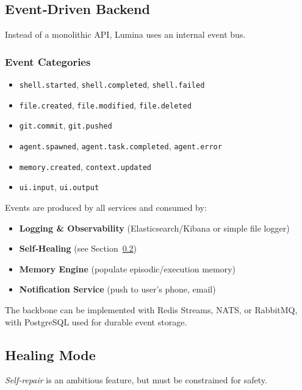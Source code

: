 \documentclass[12pt,a4paper]{article}
\begin{document}
\subsection{Event‑Driven Backend}
Instead of a monolithic API, Lumina uses an internal event bus.

\subsubsection{Event Categories}
\begin{itemize}[leftmargin=*]
    \item \texttt{shell.started}, \texttt{shell.completed}, \texttt{shell.failed}
    \item \texttt{file.created}, \texttt{file.modified}, \texttt{file.deleted}
    \item \texttt{git.commit}, \texttt{git.pushed}
    \item \texttt{agent.spawned}, \texttt{agent.task.completed}, \texttt{agent.error}
    \item \texttt{memory.created}, \texttt{context.updated}
    \item \texttt{ui.input}, \texttt{ui.output}
\end{itemize}

Events are produced by all services and consumed by:
\begin{itemize}[leftmargin=*]
    \item \textbf{Logging \& Observability} (Elasticsearch/Kibana or simple file logger)
    \item \textbf{Self‑Healing} (see Section~\ref{sec:healing})
    \item \textbf{Memory Engine} (populate episodic/execution memory)
    \item \textbf{Notification Service} (push to user’s phone, email)
\end{itemize}

The backbone can be implemented with Redis Streams, NATS, or RabbitMQ, with PostgreSQL used for durable event storage.

\subsection{Healing Mode}
\label{sec:healing}
\textit{Self‑repair} is an ambitious feature, but must be constrained for safety.
\end{document}
